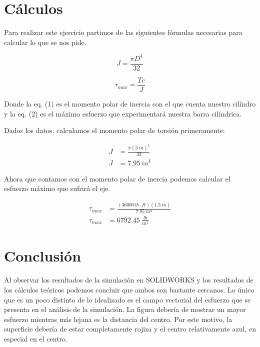\documentclass[12pt, letterpaper]{article}
\begin{document}
\section*{Cálculos}

Para realizar este ejercicio partimos de las siguientes fórmulas necesarias para calcular lo que se nos pide.

\begin{equation}
	J = \frac{\pi D^4}{32}
\end{equation}

\begin{equation}
	\tau_{max} = \frac{Tc}{J}
\end{equation}

Donde la eq. (1) es el momento polar de inercia con el que cuenta nuestro cilíndro y la eq. (2) es el máximo esfuerzo que experimentará nuestra barra cilíndrica.

Dados los datos, calculamos el momento polar de torsión primeramente:

\begin{equation}
	\begin{split}
		J &= \frac{\pi (3\ in)^4}{32}\\
		J &= 7.95\ in^4
	\end{split}
\end{equation}

Ahora que contamos con el momento polar de inercia podemos calcular el esfuerzo máximo que sufrirá el eje.

\begin{equation}
	\boxed{\begin{split}
		\tau_{max} &= \frac{(36000\ lb \cdot ft)(1.5\ in)}{7.95\ in^4}\\
		\tau_{max} &= 6792.45\ \frac{lb}{in^2}
	\end{split}}
\end{equation}
\section*{Conclusión}

Al observar los resultados de la simulación en SOLIDWORKS y los resultados de los cálculos teóricos podemos concluir que ambos son bastante cercanos. Lo único que es un poco distinto de lo idealizado es el campo vectorial del esfuerzo que se presenta en el análisis de la simulación. La figura debería de mostrar un mayor esfuerzo mientras más lejana es la distancia del centro. Por este motivo, la superficie debería de estar completamente rojiza y el centro relativamente azul, en especial en el centro.
\renewcommand\refname{Referencias}
\printbibliography
\end{document}
